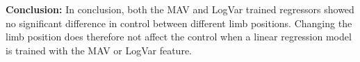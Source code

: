 \textbf{Conclusion:} 
In conclusion, both the MAV and LogVar trained regressors showed no significant difference in control between different limb positions. Changing the limb position does therefore not affect the control when a linear regression model is trained with the MAV or LogVar feature. 

\printbibliography

